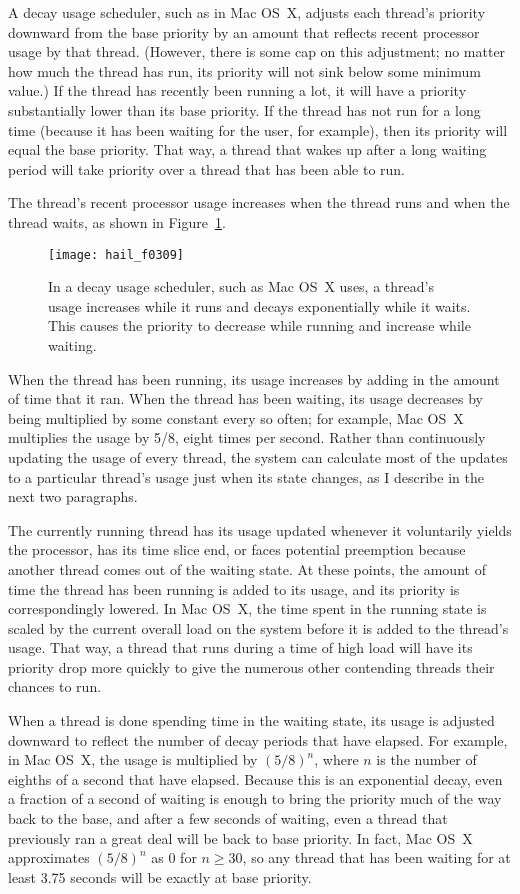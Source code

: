 A decay usage scheduler, such as in Mac OS~X, adjusts each thread's
priority downward from the base priority by an amount that reflects
recent processor usage by that thread.  (However, there is some cap on
this adjustment; no matter how much the thread has run, its priority
will not sink below some minimum value.)  If the thread has recently
been running a lot, it will have a priority substantially lower than
its base priority.  If the thread has not run for a long time (because
it has been waiting for the user, for example), then its priority will
equal the base priority.  That way, a thread that wakes up after a
long waiting period will take priority over a thread that has been
able to run.

The thread's recent processor usage increases when the thread runs
and  when the thread waits, as shown in
Figure~\ref{scan-3-4}.
\begin{figure}
\centerline{\texttt{[image: hail\_f0309]}}
\caption{In a decay usage scheduler, such as Mac OS~X uses, a thread's
  usage increases while it runs and decays exponentially while it
  waits.  This causes the priority to decrease while running and
  increase while waiting.}
\label{scan-3-4}
\end{figure}
When the thread has been
running, its usage increases by adding in the amount of time that it
ran.  When the thread has been waiting, its usage decreases by being
multiplied by some constant every so often; for example, Mac OS~X
multiplies the usage by 5/8, eight times per second.
Rather than continuously updating the usage of every thread, the
system can calculate most of the updates to a particular thread's usage just when its state
changes, as I describe in the next two paragraphs.

The currently running thread has its usage updated whenever it voluntarily yields the
processor, has its time slice end, or faces potential preemption
because another thread comes out of the waiting state.  At these
points, the amount of time the thread has
been running is added to its usage, and its priority is correspondingly lowered.  In
Mac OS~X, the time spent in the running state is scaled by the current
overall load on the system before it is added to the thread's usage.
That way, a thread that runs during a time of high load will have its
priority drop more quickly to give the numerous other
contending threads their chances to run.

When a thread is done spending time in the waiting state, its usage is
adjusted downward to reflect the number of decay periods that have
elapsed.  For example, in Mac OS~X, the usage is multiplied by
$(5/8)^n$, where $n$ is the number of eighths of a second that have
elapsed.  Because this is an exponential decay, even a fraction of a
second of waiting is enough to bring the priority much of the way back
to the base, and after a few seconds of waiting, even a thread that
previously ran a great deal will be back to base priority.  In fact,
Mac OS~X approximates $(5/8)^n$ as 0 for $n \geq 30$, so any thread
that has been waiting for at least 3.75 seconds will be exactly at
base priority.

